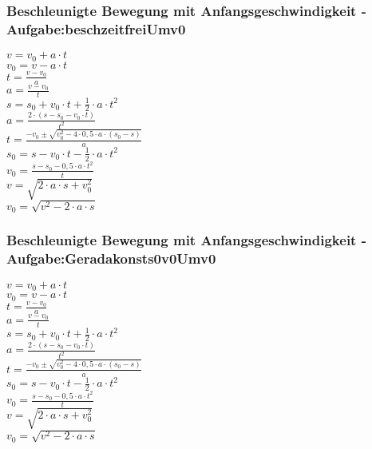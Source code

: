 \subsubsection{Beschleunigte Bewegung mit Anfangsgeschwindigkeit - Aufgabe:beschzeitfreiUmv0} 
\begin{minipage}{0.45\textwidth} 
$ v = v_{0}  + a\cdot t $\\ 
$ v_{0}  = v - a\cdot t $\\ 
$ t = \frac{v - v_{0} }{a} $\\ 
$ a = \frac{v - v_{0} }{  t} $\\ 
$ s = s_{0}  + v_{0} \cdot t + \frac{1}{2}\cdot a\cdot t^{2} $\\ 
$ a = \frac{2\cdot (s - s_{0}  - v_{0} \cdot t)}{     t^{2} } $\\ 
$ t = \frac{-v_{0}  \pm \sqrt{v_{0} ^{2} -4\cdot 0,5\cdot a\cdot (s_{0}  -s)}}{       a} $\\ 
$ s_{0}  = s - v_{0} \cdot t - \frac{1}{2}\cdot a\cdot t^{2} $\\ 
$ v_{0}  =\frac{s-s_{0} -0,5\cdot a\cdot t^{2} }{    t} $\\ 
$ v  =\sqrt{2\cdot a \cdot s+ v_{0}^2} $\\ 
$ v_{0}  =\sqrt{v^2-2\cdot a \cdot s} $\\ 
\end{minipage} 
\begin{minipage}{0.45\textwidth} 
 
\end{minipage} 
\subsubsection{Beschleunigte Bewegung mit Anfangsgeschwindigkeit - Aufgabe:Geradakonsts0v0Umv0} 
\begin{minipage}{0.45\textwidth} 
$ v = v_{0}  + a\cdot t $\\ 
$ v_{0}  = v - a\cdot t $\\ 
$ t = \frac{v - v_{0} }{a} $\\ 
$ a = \frac{v - v_{0} }{  t} $\\ 
$ s = s_{0}  + v_{0} \cdot t + \frac{1}{2}\cdot a\cdot t^{2} $\\ 
$ a = \frac{2\cdot (s - s_{0}  - v_{0} \cdot t)}{     t^{2} } $\\ 
$ t = \frac{-v_{0}  \pm \sqrt{v_{0} ^{2} -4\cdot 0,5\cdot a\cdot (s_{0}  -s)}}{       a} $\\ 
$ s_{0}  = s - v_{0} \cdot t - \frac{1}{2}\cdot a\cdot t^{2} $\\ 
$ v_{0}  =\frac{s-s_{0} -0,5\cdot a\cdot t^{2} }{    t} $\\ 
$ v  =\sqrt{2\cdot a \cdot s+ v_{0}^2} $\\ 
$ v_{0}  =\sqrt{v^2-2\cdot a \cdot s} $\\ 
\end{minipage} 
\begin{minipage}{0.45\textwidth} 
 
\end{minipage} 
